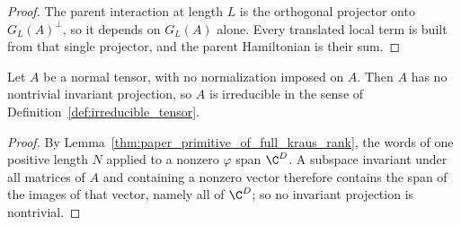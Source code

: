 \begin{proof}
    \leanok
    The parent interaction at length $L$ is the orthogonal projector onto
    $G_L(A)^\perp$, so it depends on $G_L(A)$ alone.  Every translated local
    term is built from that single projector, and the parent Hamiltonian is
    their sum.
\end{proof}

\begin{lemma}
    \label{thm:normal_irreducible_tensor}
    \leanok
    Let $A$ be a normal tensor, with no normalization imposed on $A$.  Then
    $A$ has no nontrivial invariant projection, so $A$ is
    irreducible in the sense of Definition~\ref{def:irreducible_tensor}.
\end{lemma}

\begin{proof}
    \leanok
    By Lemma~\ref{thm:paper_primitive_of_full_kraus_rank}, the words of one
    positive length $N$ applied to a nonzero $\varphi$ span $\C^D$.
    A subspace invariant under all matrices
    of $A$ and containing a nonzero vector therefore contains the span of the
    images of that vector, namely all of $\C^D$; so no invariant projection is
    nontrivial.
\end{proof}

